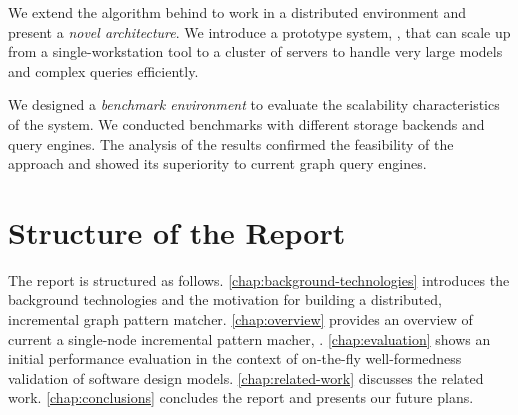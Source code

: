 We extend the algorithm behind \eiq{} to work in a distributed environment and present a \emph{novel architecture}. We introduce a prototype system, \iqd{}, that can scale up from a single-workstation tool to a cluster of servers to handle very large models and complex queries efficiently. 

We designed a \emph{benchmark environment} to evaluate the scalability characteristics of the system. We conducted benchmarks with different storage backends and query engines. The analysis of the results confirmed the feasibility of the approach and showed its superiority to current %
graph query engines.

\section{Structure of the Report}
 
The report is structured as follows. 
\autoref{chap:background-technologies} introduces the background technologies and the motivation for building a distributed, incremental graph pattern matcher. \autoref{chap:overview} provides an overview of current a single-node incremental pattern macher, \eiq{}. 
\autoref{chap:evaluation} shows an initial performance evaluation in the context of on-the-fly well-formedness validation of software design models. 
\autoref{chap:related-work} discusses the related work. \autoref{chap:conclusions} concludes the report and presents our future plans. 

